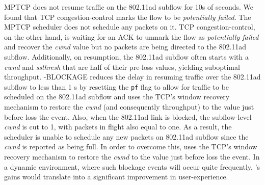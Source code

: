 MPTCP does not resume traffic on the 802.11ad subflow for
10s of seconds.
We found that 
TCP congestion-control 
marks
the flow to be
\emph{potentially failed}. The MPTCP scheduler 
does not schedule any
packets on it. TCP congestion-control, on the other hand, is waiting
for an ACK to 
unmark the flow as \emph{potentially failed} and 
recover the \emph{cwnd} value but no packets are being directed to
the 802.11ad subflow.
\fi
Additionally, on
resumption, the 802.11ad subflow often starts with a \emph{cwnd} and
\emph{ssthresh} that are half of their pre-loss
values, yielding suboptimal throughput. 
\name-BLOCKAGE reduces the delay in resuming traffic over the 802.11ad
subflow to less than 1 s
by resetting the {{\tt pf}} flag to allow for traffic to be
scheduled on the 802.11ad subflow and uses the TCP's window recovery
mechanism to restore the \emph{cwnd} (and consequently throughput) to the value just before loss the
event. 
Also, 
when the 802.11ad link is blocked, the
subflow-level \emph{cwnd} is cut to 1, with packets in flight also
equal to one. As a result, the scheduler is unable to schedule any new
packets on 802.11ad subflow since the \emph{cwnd} is reported as being
full. In order to overcome this, \name uses the TCP's window recovery
mechanism to restore the \emph{cwnd} to the value just before loss the
event. 
\fi 
In a dynamic environment, where such blockage events will occur quite
frequently, \name's gains would translate into a significant
improvement in user-experience.
